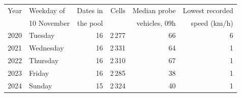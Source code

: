 \begin{tabular}{llrrrr}
\toprule
Year & Weekday of & Dates in & Cells & Median probe & Lowest recorded \\
 & 10 November & the pool & & vehicles, 09h & speed (km/h) \\
\midrule
2020 & Tuesday & 16 & 2\,277 & 66 & 6 \\
2021 & Wednesday & 16 & 2\,331 & 64 & 1 \\
2022 & Thursday & 16 & 2\,310 & 67 & 1 \\
2023 & Friday & 16 & 2\,285 & 38 & 1 \\
2024 & Sunday & 15 & 2\,324 & 40 & 1 \\
\bottomrule
\end{tabular}
